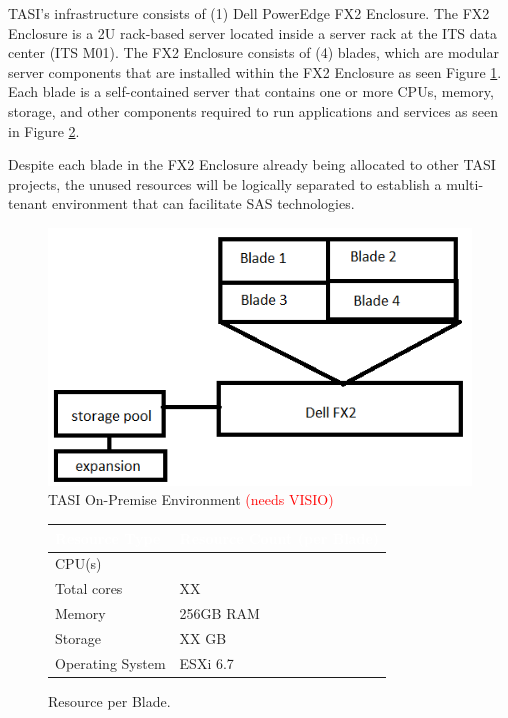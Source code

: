TASI's infrastructure consists of (1) Dell PowerEdge FX2 Enclosure. The FX2 Enclosure is a 2U rack-based server located inside a server rack at the ITS data center (ITS M01). The FX2 Enclosure consists of (4) blades, which are modular server components that are installed within the FX2 Enclosure as seen Figure \ref{Current ENV}. Each blade is a self-contained server that contains one or more CPUs, memory, storage, and other components required to run applications and services as seen in Figure \ref{BLD-RSRC}.

Despite each blade in the FX2 Enclosure already being allocated to other TASI projects, the unused resources will be logically separated to establish a multi-tenant environment that can facilitate SAS technologies.

\begin{figure}[H]
    \centering
    \includegraphics[scale = 0.70]{images/currentENV.png}
    \caption{TASI On-Premise Environment \textcolor{red}{(needs VISIO)} }
    \label{Current ENV}
\end{figure}

\begin{figure}[H]
\begin{center}
    \renewcommand{\arraystretch}{1.5}
    \begin{tabular}{|>{\raggedright\arraybackslash}l 
                    |>{\raggedright\arraybackslash}m{3cm}
                    |}
    \hline
    \rowcolor[HTML]{196fb4}\centering\textcolor{white}{\large Resource Type} 
                            & \centering\textcolor{white}{\large Resource Count (per Blade)} 
                            \tabularnewline 
    \hline
    CPU(s)              & 12 \\\hline
    Total cores         & XX \\\hline
    Memory              & 256GB RAM \\\hline
    Storage             & XX GB \\\hline
    Operating System    & ESXi 6.7 \\\hline
    \end{tabular}
\end{center}
\caption{Resource per Blade.}
\label{BLD-RSRC}
\end{figure}

